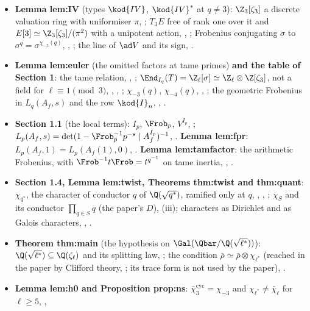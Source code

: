 \begin{itemize}
\item \textbf{Lemma lem:IV} (types $\kod{IV}$, $\kod{IV}^*$ at $q\ne3$): $\Z_3[\zeta_3]$ a discrete valuation ring with uniformiser $\pi$, ; $T_3E$ free of
rank one over it and $E[3]\simeq\Z_3[\zeta_3]/(\pi^2)$ with a unipotent action, , ; Frobenius conjugating $\sigma$ to
$\sigma^q=\sigma^{\chi_{-3}(q)}$, , ; the line of $\ad V$ and its sign, .
\item \textbf{Lemma lem:euler} (the omitted factors at tame primes) \textbf{and the table of Section 1}: the tame relation, ,
; $\End_{I_q}(T)=\Z_\ell[\sigma]\simeq\Z_\ell\otimes\Z[\zeta_3]$, not a field for $\ell\equiv1\pmod3$, , ,
; $\chi_{-3}(q)$, $\chi_{-4}(q)$, , ; the geometric Frobenius in $L_q(A_f,s)$ and the row
$\kod{I}_n$, , .
\item \textbf{Section 1.1} (the local terms): $I_p$, $\Frob_p$, $V^{I_p}$, ; $L_p(A_f,s)=\det(1-\Frob_p^{-1}p^{-s}\mid A_f^{I_p})^{-1}$,
. \textbf{Lemma lem:fpr}: $L_p(A_f,1)=L_p(A_f(1),0)$, . \textbf{Lemma lem:tamfactor}: the arithmetic
Frobenius, with $\Frob^{-1}t\Frob=t^{q^{-1}}$ on tame inertia, , .
\item \textbf{Section 1.4, Lemma lem:twist, Theorems thm:twist and thm:quant}: $\chi_{q^*}$, the character of conductor $q$ of $\Q(\sqrt{q^*})$, ramified only at $q$,
, , ; $\chi_S$ and its conductor $\prod_{q\in S}q$ (the paper's $D$), (iii); characters as Dirichlet and as
Galois characters, , .
\item \textbf{Theorem thm:main} (the hypothesis on $\Gal(\Qbar/\Q(\sqrt{\ell^*}))$): $\Q(\sqrt{\ell^*})\subseteq\Q(\zeta_\ell)$ and its splitting law, ;
the condition $\bar\rho\simeq\bar\rho\otimes\chi_{\ell^*}$ (reached in the paper by Clifford theory, ; its trace form
 is not used by the paper), .
\item \textbf{Lemma lem:h0 and Proposition prop:ns}: $\bar\chi_3^{\mathrm{cyc}}=\chi_{-3}$ and $\chi_{\ell^*}\ne\bar\chi_\ell$ for $\ell\ge5$, ,

\end{itemize}
